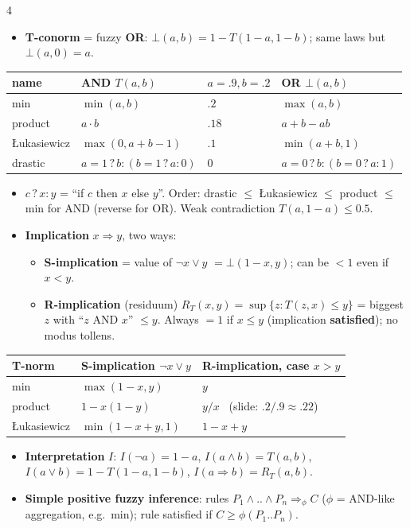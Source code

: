 \documentclass[10pt]{article}
\renewcommand{\arraystretch}{0.95}
\newcommand{\kw}[1]{\textbf{#1}}
\begin{document}
\begin{multicols*}{4}
\begin{itemize}
\item \kw{T-conorm} = fuzzy \kw{OR}: $\bot(a,b)=1-T(1-a,1-b)$; same laws but $\bot(a,0)=a$.
\end{itemize}
\renewcommand{\arraystretch}{1.05}
\begin{tabular}{@{}l|l|l|l@{}}
name & AND $T(a,b)$ & $a{=}.9,b{=}.2$ & OR $\bot(a,b)$\\\hline
min & $\min(a,b)$ & $.2$ & $\max(a,b)$\\
product & $a\cdot b$ & $.18$ & $a+b-ab$\\
\L ukasiewicz & $\max(0,a+b-1)$ & $.1$ & $\min(a+b,1)$\\
drastic & $a{=}1\,?\,b:(b{=}1\,?\,a:0)$ & $0$ & $a{=}0\,?\,b:(b{=}0\,?\,a:1)$\\
\end{tabular}
\begin{itemize}
\item $c\,?\,x:y$ = ``if $c$ then $x$ else $y$''. Order: drastic $\le$ \L ukasiewicz $\le$ product $\le$ min for AND (reverse for OR). Weak contradiction $T(a,1-a)\le0.5$.
\item \kw{Implication} $x\Rightarrow y$, two ways:
\begin{itemize}
\item \kw{S-implication} = value of $\neg x\vee y$ $=\bot(1-x,y)$; can be $<1$ even if $x<y$.
\item \kw{R-implication} (residuum) $R_T(x,y)=\sup\{z: T(z,x)\le y\}$ = biggest $z$ with ``$z$ AND $x$'' $\le y$. Always $=1$ if $x\le y$ (implication \kw{satisfied}); no modus tollens.
\end{itemize}
\end{itemize}
\begin{tabular}{@{}l|l|l@{}}
T-norm & S-implication $\neg x\vee y$ & R-implication, case $x>y$\\\hline
min & $\max(1-x,y)$ & $y$\\
product & $1-x(1-y)$ & $y/x$ \ (slide: $.2/.9\approx.22$)\\
\L ukasiewicz & $\min(1-x+y,1)$ & $1-x+y$\\
\end{tabular}
\begin{itemize}
\item \kw{Interpretation} $I$: $I(\neg a)=1-a$, $I(a\wedge b)=T(a,b)$, $I(a\vee b)=1-T(1-a,1-b)$, $I(a\Rightarrow b)=R_T(a,b)$.
\item \kw{Simple positive fuzzy inference}: rules $P_1\wedge..\wedge P_n\Rightarrow_\phi C$ ($\phi$ = AND-like aggregation, e.g.\ min); rule satisfied if $C\ge\phi(P_1..P_n)$.

\end{itemize}
\end{multicols*}
\end{document}
